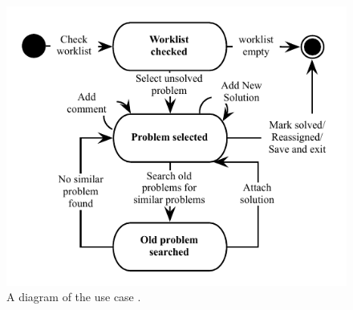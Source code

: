 \begin{figure}[htbp]
\begin{center}
 \includegraphics[scale=1]{input/application_domain_analysis/solve_problem_use_case}
\caption{A diagram of the use case \ucsolproblem{}.}
\label{fig:solve_problem_use_case}
\end{center}
\end{figure}

